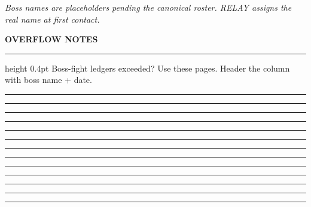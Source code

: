 \documentclass[10pt]{article}
\newcommand{\writeline}[1][\linewidth]{\rule[-2pt]{#1}{0.4pt}}
\begin{document}
\vfill
\textit{\footnotesize Boss names are placeholders pending the canonical
roster. RELAY assigns the real name at first contact.}
\newpage



{\sffamily\bfseries\small OVERFLOW NOTES}\par
\vspace{4pt}\hrule height 0.4pt\vspace{6pt}
\footnotesize Boss-fight ledgers exceeded? Use these pages. Header the
column with boss name + date.\par
\vspace{12pt}
\writeline\par\vspace{12pt}\writeline\par\vspace{12pt}\writeline\par
\vspace{12pt}\writeline\par\vspace{12pt}\writeline\par
\vspace{12pt}\writeline\par\vspace{12pt}\writeline\par
\vspace{12pt}\writeline\par\vspace{12pt}\writeline\par
\vspace{12pt}\writeline\par\vspace{12pt}\writeline\par
\vspace{12pt}\writeline\par\vspace{12pt}\writeline\par
\newpage
\end{document}
